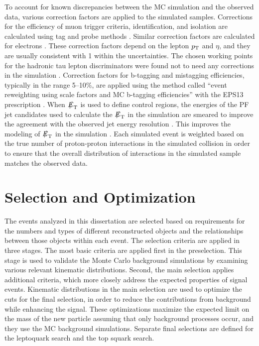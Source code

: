 \documentclass[12pt]{thesis}  %
\def\eslash{\ensuremath{{\hbox{$E$\kern-0.6em\lower-.05ex\hbox{/}\kern0.10em}}}}
\def\met{\mbox{$\eslash_\text{T}$}\xspace} %
\begin{document}
To account for known discrepancies between the MC simulation and the observed data, various correction factors are applied to the simulated samples. Corrections for the efficiency of muon trigger criteria, identification, and isolation are calculated using tag and probe methods \cite{MuonRefEffs}. Similar correction factors are calculated for electrons \cite{EgammaTagAndProbe,EgammaScaleFactors}. These correction factors depend on the lepton $p_{\mathrm{T}}$ and $\eta$, and they are usually consistent with 1 within the uncertainties. The chosen working points for the hadronic tau lepton discriminators were found not to need any corrections in the simulation \cite{TauID}. Correction factors for b-tagging and mistagging efficiencies, typically in the range 5--10\%, are applied using the method called ``event reweighting using scale factors and MC b-tagging efficiencies'' with the EPS13 prescription \cite{BTagSFMethods}. When \met is used to define control regions, the energies of the PF jet candidates used to calculate the \met in the simulation are smeared to improve the agreement with the observed jet energy resolution \cite{CMS-JEC}. This improves the modeling of \met in the simulation \cite{CMS-AN-2012-333}. Each simulated event is weighted based on the true number of proton-proton interactions in the simulated collision in order to ensure that the overall distribution of interactions in the simulated sample matches the observed data.

\section{Selection and Optimization
\label{sec:sel}}

The events analyzed in this dissertation are selected based on requirements for the numbers and types of different reconstructed objects and the relationships between those objects within each event. The selection criteria are applied in three stages. The most basic criteria are applied first in the preselection. This stage is used to validate the Monte Carlo background simulations by examining various relevant kinematic distributions. Second, the main selection applies additional criteria, which more closely address the expected properties of signal events. Kinematic distributions in the main selection are used to optimize the cuts for the final selection, in order to reduce the contributions from background while enhancing the signal. These optimizations maximize the expected limit on the mass of the new particle assuming that only background processes occur, and they use the MC background simulations. Separate final selections are defined for the leptoquark search and the top squark search.
\end{document}
